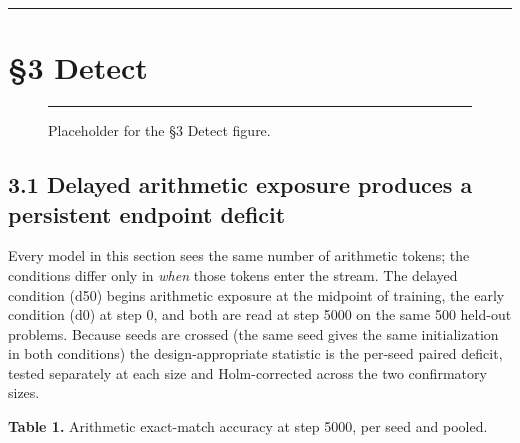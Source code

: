 \documentclass[11pt]{article}
\begin{document}
\begin{center}\rule{0.5\linewidth}{0.5pt}\end{center}

\section{§3 Detect}\label{detect}

\begin{figure}[t]
\centering
\rule{\linewidth}{36.00\baselineskip}
\caption{Placeholder for the §3 Detect figure.}
\end{figure}

\subsection{3.1 Delayed arithmetic exposure produces a persistent endpoint deficit}\label{delayed-arithmetic-exposure-produces-a-persistent-endpoint-deficit}

Every model in this section sees the same number of arithmetic tokens; the conditions
differ only in \emph{when} those tokens enter the stream. The delayed condition (d50) begins
arithmetic exposure at the midpoint of training, the early condition (d0) at step 0, and
both are read at step 5000 on the same 500 held-out problems. Because seeds are crossed (the same seed gives the same initialization in both conditions) the design-appropriate
statistic is the per-seed paired deficit, tested separately at each size and Holm-corrected
across the two confirmatory sizes.

\textbf{Table 1.} Arithmetic exact-match accuracy at step 5000, per seed and pooled.
\end{document}
